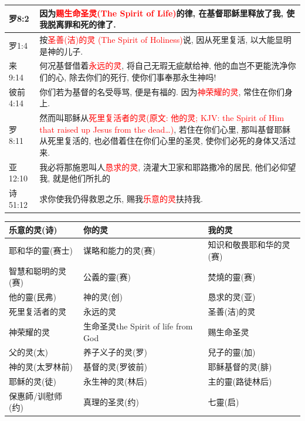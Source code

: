 \begin{table}[H]
\begin{tabular}{p{5em}|p{44em}}
罗8:2&因为\textcolor{red}{赐生命圣灵(The Spirit of Life)}的律, 在基督耶稣里释放了我, 使我脱离罪和死的律了.\\  \midrule

罗1:4&按\textcolor{red}{圣善(洁)的灵 (The Spirit of Holiness)}说, 因从死里复活, 以大能显明是神的儿子.\\  \midrule
来9:14&何况基督借着\textcolor{red}{永远的灵}, 将自己无瑕无疵献给神, 他的血岂不更能洗净你们的心, 除去你们的死行, 使你们事奉那永生神吗!\\  \midrule
彼前4:14&你们若为基督的名受辱骂, 便是有福的. 因为\textcolor{red}{神荣耀的灵}, 常住在你们身上.\\  \midrule

罗8:11&然而叫耶稣从\textcolor{red}{死里复活者的灵(原文: 他的灵; KJV: the Spirit of Him that raised up Jesus from the dead…)}, 若住在你们心里, 那叫基督耶稣从死里复活的, 也必借着住在你们心里的圣灵, 使你们必死的身体又活过来.\\  \midrule

亚12:10&我必将那施恩叫人\textcolor{red}{恳求的灵}, 浇灌大卫家和耶路撒冷的居民, 他们必仰望我, 就是他们所扎的\\  \midrule
诗51:12&求你使我仍得救恩之乐, 赐我\textcolor{red}{乐意的灵}扶持我.\\  \midrule
\end{tabular}
\end{table}














\begin{table}[H]
\centering
\begin{tabular}{p{10em}|p{18em}|p{13em}}  \toprule
乐意的灵(诗)&你的灵&我的灵\\  \midrule
耶和华的靈(赛士)&谋略和能力的灵(赛)&知识和敬畏耶和华的灵(赛)\\  \midrule
智慧和聪明的灵(赛)&公義的靈(赛)&焚燒的靈(赛)\\  \midrule
他的靈(民弗)&神的灵(创)&恳求的灵(亚)\\  \midrule

死里复活者的灵&永远的灵&圣善(洁)的灵\\  \midrule
神荣耀的灵&生命圣灵the Spirit of life from God&赐生命圣灵\\  \midrule
父的灵(太)&养子义子的灵(罗)&兒子的靈(加)\\  \midrule
神的灵(太罗林前)&基督的灵(罗彼前)&耶稣基督的灵(腓)\\  \midrule
耶稣的灵(徒)&永生神的灵(林后)&主的靈(路徒林后)\\  \midrule
保惠師/训慰师(约)&真理的圣灵(约)&七靈(启)\\  \midrule
\end{tabular}
\end{table}





